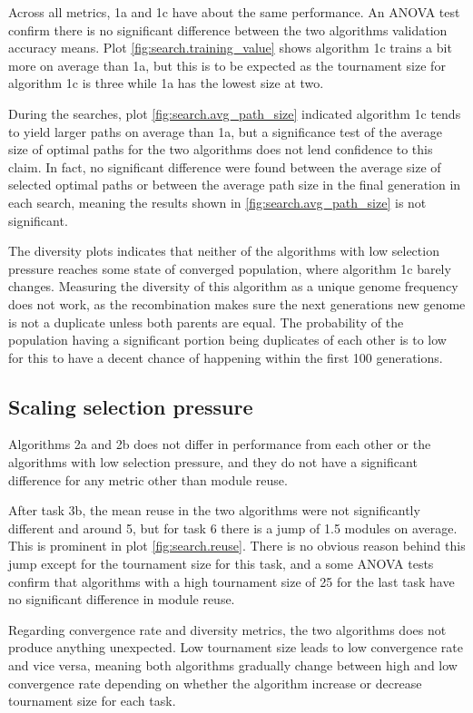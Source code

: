Across all metrics, 1a and 1c have about the same performance. An ANOVA test confirm there is no significant difference between the two algorithms validation accuracy means. Plot \ref{fig:search.training_value} shows algorithm 1c trains a bit more on average than 1a, but this is to be expected as the tournament size for algorithm 1c is three while 1a has the lowest size at two. 

During the searches, plot \ref{fig:search.avg_path_size} indicated algorithm 1c tends to yield larger paths on average than 1a, but a significance test of the average size of optimal paths for the two algorithms does not lend confidence to this claim. In fact, no significant difference were found between the average size of selected optimal paths or between the average path size in the final generation in each search, meaning the results shown in \ref{fig:search.avg_path_size} is not significant.

The diversity plots indicates that neither of the algorithms with low selection pressure reaches some state of converged population, where algorithm 1c barely changes. Measuring the diversity of this algorithm as a unique genome frequency does not work, as the recombination makes sure the next generations new genome is not a duplicate unless both parents are equal. The probability of the population having a significant portion being duplicates of each other is to low for this to have a decent chance of happening within the first 100 generations. 

\subsection{Scaling selection pressure}
Algorithms 2a and 2b does not differ in performance from each other or the algorithms with low selection pressure, and they do not have a significant difference for any metric other than module reuse. 

After task 3b, the mean reuse in the two algorithms were not significantly different and around 5, but for task 6 there is a jump of 1.5 modules on average. This is prominent in plot \ref{fig:search.reuse}. There is no obvious reason behind this jump except for the tournament size for this task, and a some ANOVA tests confirm that algorithms with a high tournament size of 25 for the last task have no significant difference in module reuse.  

Regarding convergence rate and diversity metrics, the two algorithms does not produce anything unexpected. Low tournament size leads to low convergence rate and vice versa, meaning both algorithms gradually change between high and low convergence rate depending on whether the algorithm increase or decrease tournament size for each task.

